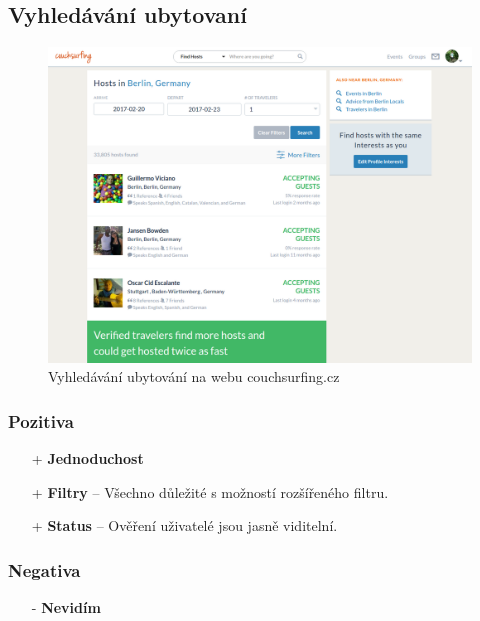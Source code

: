 
\newpage
\subsection{Vyhledávání ubytovaní}
\begin{figure}[h]
    \centering
    \includegraphics[width=1.0\textwidth]{media/couchsurfing/search.png}
    \caption{Vyhledávání ubytování na webu couchsurfing.cz}
    \label{fig:couchsurfing:search}
\end{figure}
\subsubsection*{Pozitiva}
\begin{itemize}
    \item[+] \textbf{Jednoduchost}
    \item[+] \textbf{Filtry} -- Všechno důležité s možností rozšířeného filtru.
    \item[+] \textbf{Status} -- Ověření uživatelé jsou jasně viditelní.
\end{itemize}
\subsubsection*{Negativa}
\begin{itemize}
    \item[-] \textbf{Nevidím}
\end{itemize}



